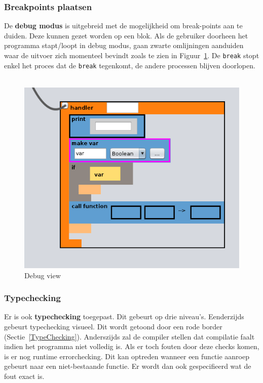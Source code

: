 \documentclass[]{article}
\begin{document}
\subsubsection{Breakpoints plaatsen}
De \textbf{debug modus} is uitgebreid met de mogelijkheid om break-points aan te duiden. Deze kunnen gezet worden op een blok. Als de gebruiker doorheen het programma stapt/loopt in debug modus, gaan zwarte omlijningen aanduiden waar de uitvoer zich momenteel bevindt zoals te zien in Figuur~\ref{debugwindow}. De \texttt{break} stopt enkel het proces dat de \texttt{break} tegenkomt, de andere processen blijven doorlopen.\\\\
\begin{figure}[H]
\centering
\includegraphics[width=1.1\textwidth]{./Functionaliteit/break.png}
\caption{Debug view}
\label{debugwindow}
\end{figure}

\subsubsection{Typechecking}
Er is ook \textbf{typechecking} toegepast. Dit gebeurt op drie niveau's. Eenderzijds gebeurt typechecking visueel. Dit wordt getoond door een rode border (Sectie~\ref{TypeChecking}). Anderszijds zal de compiler stellen dat compilatie faalt indien het programma niet volledig is. Als er toch fouten door deze checks komen, is er nog runtime errorchecking. Dit kan optreden wanneer een functie aanroep gebeurt naar een niet-bestaande functie. Er wordt dan ook gespecifieerd wat de fout exact is. 
\end{document}
